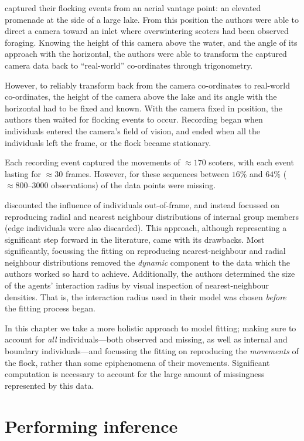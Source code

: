 \textcite{lukeman10} captured their flocking events from an aerial vantage
point: an elevated promenade at the side of a large lake. From this position
the authors were able to direct a camera toward an inlet where overwintering
scoters had been observed foraging. Knowing the height of this camera above the
water, and the angle of its approach with the horizontal, the authors were able
to transform the captured camera data back to ``real-world'' co-ordinates
through trigonometry.

However, to reliably transform back from the camera co-ordinates to real-world
co-ordinates, the height of the camera above the lake and its angle with the
horizontal had to be fixed and known. With the camera fixed in position, the
authors then waited for flocking events to occur. Recording began when
individuals entered the camera's field of vision, and ended when all the
individuals left the frame, or the flock became stationary.

Each recording event captured the movements of $\approx170$ scoters, with each
event lasting for $\approx30$ frames. However, for these sequences between
$16\%$ and $64\%$ ($\approx800$--$3000$ observations) of the data points were
missing.

\textcite{lukeman10} discounted the influence of individuals out-of-frame, and
instead focussed on reproducing radial and nearest neighbour distributions of
internal group members (edge individuals were also discarded). This approach,
although representing a significant step forward in the literature, came with
its drawbacks. Most significantly, focussing the fitting on reproducing
nearest-neighbour and radial neighbour distributions removed the \emph{dynamic}
component to the data which the authors worked so hard to achieve.
Additionally, the authors determined the size of the agents' interaction radius
by visual inspection of nearest-neighbour densities. That is, the interaction
radius used in their model was chosen \emph{before} the fitting process began.

In this chapter we take a more holistic approach to model fitting; making sure
to account for \emph{all} individuals---both observed and missing, as well as
internal and boundary individuals---and focussing the fitting on reproducing
the \emph{movements} of the flock, rather than some epiphenomena of their
movements. Significant computation is necessary to account for the large amount
of missingness represented by this data.

\section{Performing inference}

